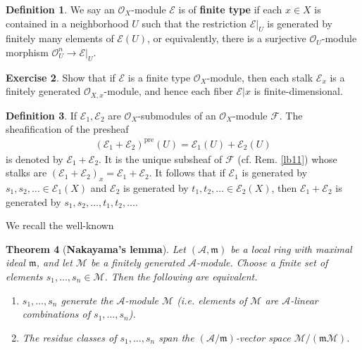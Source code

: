 \documentclass[12pt,b5paper,notitlepage]{report}
\theoremstyle{definition}
\newtheorem{df}{Definition}[section]
\newtheorem{exe}[df]{Exercise}
\theoremstyle{plain}
\newtheorem{thm}[df]{Theorem}
\newcommand{\fk}{\mathfrak}
\newcommand{\mc}{\mathcal}
\newcommand{\scr}{\mathscr}
\newcommand{\pre}{\mathrm{pre}}
\newcommand{\mk}{\mathfrak m}
\numberwithin{equation}{section}
\begin{document}
\begin{df}
We say an $\scr O_X$-module $\scr E$ is of \textbf{finite type} if each $x\in X$ is contained in a neighborhood $U$ such that the restriction $\scr E|_U$ is generated by finitely many elements of $\scr E(U)$, or equivalently, there is a surjective $\scr O_U$-module morphism $\scr O_U^n\rightarrow\scr E|_U$.
\end{df}




\begin{exe}
Show that if $\scr E$ is a finite type $\scr O_X$-module, then each stalk $\scr E_x$ is a finitely generated $\scr O_{X,x}$-module, and hence each fiber $\scr E|x$ is finite-dimensional.
\end{exe}
\begin{df}
If $\scr E_1,\scr E_2$ are $\scr O_X$-submodules of an $\scr O_X$-module $\scr F$. The sheafification of the presheaf
\begin{align}
(\scr E_1+\scr E_2)^\pre(U)=\scr E_1(U)+\scr E_2(U)
\end{align}
is denoted by $\scr E_1+\scr E_2$. \index{EE@$\scr E_1+\scr E_2$} It is the unique subsheaf of $\scr F$ (cf. Rem. \ref{lb11}) whose stalks are $(\scr E_1+\scr E_2)_x=\scr E_1+\scr E_2$. It follows that if $\scr E_1$ is generated by $s_1,s_2,\dots\in\scr E_1(X)$ and $\scr E_2$ is generated by $t_1,t_2,\dots\in\scr E_2(X)$, then $\scr E_1+\scr E_2$ is generated by $s_1,s_2,\dots,t_1,t_2,\dots$.
\end{df}


We recall the well-known

\begin{thm}[\textbf{Nakayama's lemma}]\label{lb281}  
Let $(\mc A,\mk)$ be a local ring with maximal ideal $\fk m$, and let $\mc M$ be a finitely generated $\mc A$-module. Choose a finite set of elements $s_1,\dots,s_n\in\mc M$. Then the following are equivalent.
\begin{enumerate}[label=(\arabic*)]
\item $s_1,\dots,s_n$ generate the $\mc A$-module $\mc M$ (i.e. elements of $\mc M$ are $\mc A$-linear combinations of $s_1,\dots,s_n$).
\item The residue classes of $s_1,\dots,s_n$ span the $(\mc A/\mk)$-vector space $\mc M/(\fk m\mc M)$.
\end{enumerate}
\end{thm}
\end{document}
